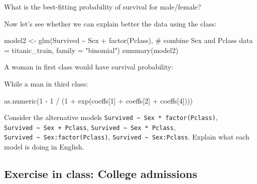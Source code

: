 \documentclass[
  letterpaper,
  DIV=11,
  numbers=noendperiod]{scrreprt}
\newenvironment{Shaded}{\begin{snugshade}}{\end{snugshade}}
\newcommand{\NormalTok}[1]{\textcolor[rgb]{0.00,0.23,0.31}{#1}}
\begin{document}
What is the best-fitting probability of survival for male/female?

\begin{Shaded}
\end{Shaded}

Now let's see whether we can explain better the data using the class:

\begin{Shaded}
\begin{Highlighting}[]
\NormalTok{model2 \textless{}{-} glm(Survived \textasciitilde{} Sex + factor(Pclass), \# combine Sex and Pclass}
\NormalTok{              data = titanic\_train,}
\NormalTok{              family = "binomial")}
\NormalTok{summary(model2)}
\end{Highlighting}
\end{Shaded}

A woman in first class would have survival probability:

\begin{Shaded}
\end{Shaded}

While a man in third class:

\begin{Shaded}
\begin{Highlighting}[]
\NormalTok{as.numeric(1 {-} 1 / (1 + exp(coeffs[1] + coeffs[2] + coeffs[4])))}
\end{Highlighting}
\end{Shaded}

Consider the alternative models
\texttt{Survived\ \textasciitilde{}\ Sex\ *\ factor(Pclass)},
\texttt{Survived\ \textasciitilde{}\ Sex\ +\ Pclass},
\texttt{Survived\ \textasciitilde{}\ Sex\ *\ Pclass},
\texttt{Survived\ \textasciitilde{}\ Sex:factor(Pclass)},
\texttt{Survived\ \textasciitilde{}\ Sex:Pclass}. Explain what each
model is doing in English.

\subsection{Exercise in class: College
admissions}\label{exercise-in-class-college-admissions}
\end{document}
